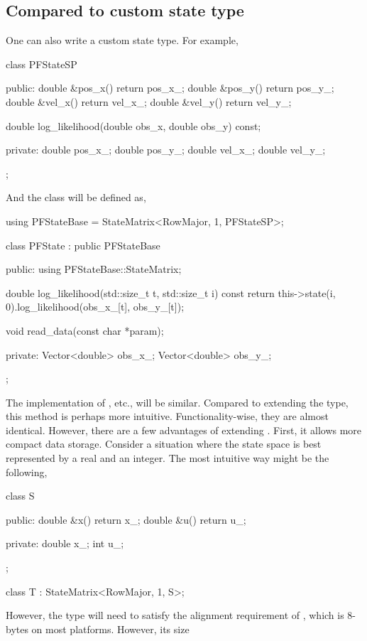 \subsection{Compared to custom state type}
\label{sub:Compared to custom state type}

One can also write a custom state type. For example,
\begin{cppcode}
  class PFStateSP
  {
      public:
      double &pos_x() { return pos_x_; }
      double &pos_y() { return pos_y_; }
      double &vel_x() { return vel_x_; }
      double &vel_y() { return vel_y_; }

      double log_likelihood(double obs_x, double obs_y) const;

      private:
      double pos_x_;
      double pos_y_;
      double vel_x_;
      double vel_y_;
  };
\end{cppcode}
And the  class will be defined as,
\begin{cppcode}
  using PFStateBase = StateMatrix<RowMajor, 1, PFStateSP>;

  class PFState : public PFStateBase
  {
      public:
      using PFStateBase::StateMatrix;

      double log_likelihood(std::size_t t, std::size_t i) const
      {
          return this->state(i, 0).log_likelihood(obs_x_[t], obs_y_[t]);
      }

      void read_data(const char *param);

      private:
      Vector<double> obs_x_;
      Vector<double> obs_y_;
  };
\end{cppcode}
The implementation of , etc., will be similar. Compared to
extending the  type, this method is perhaps more
intuitive. Functionality-wise, they are almost identical. However, there are a
few advantages of extending . First, it allows
more compact data storage. Consider a situation where the state space is best
represented by a real and an integer. The most intuitive way might be the
following,
\begin{cppcode}
  class S
  {
      public:
      double &x() { return x_; }
      double &u() { return u_; }

      private:
      double x_;
      int u_;
  };

  class T : StateMatrix<RowMajor, 1, S>;
\end{cppcode}
However, the type  will need to satisfy the alignment requirement
of , which is 8-bytes on most platforms. However, its size
